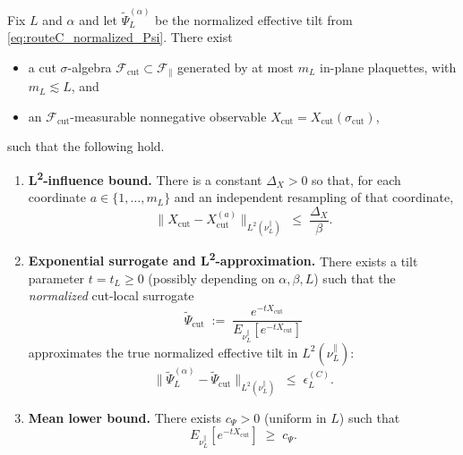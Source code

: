 \begin{proposition}\label{ass:routeC_cut_local_surrogate}
Fix $L$ and $\alpha$ and let $\widetilde\Psi_L^{(\alpha)}$ be the normalized effective tilt from \eqref{eq:routeC_normalized_Psi}.
There exist
\begin{itemize}
\item a cut $\sigma$-algebra $\mathscr F_{\mathrm{cut}}\subset \mathscr F_{\parallel}$ generated by at most $m_L$ in-plane plaquettes, with $m_L\lesssim L$, and
\item an $\mathscr F_{\mathrm{cut}}$-measurable nonnegative observable $X_{\mathrm{cut}}=X_{\mathrm{cut}}(\sigma_{\mathrm{cut}})$,
\end{itemize}
such that the following hold.
\begin{enumerate}[label=(\roman*)]
\item \textbf{L\textsuperscript{2}-influence bound.}
There is a constant $\Delta_X>0$ so that, for each coordinate $a\in\{1,\dots,m_L\}$ and an independent resampling of that coordinate,
\begin{equation}\label{eq:routeC_cut_influence_L2}
\big\|X_{\mathrm{cut}}-X_{\mathrm{cut}}^{(a)}\big\|_{L^2(\nu_L^{\parallel})}
\;\le\;
\frac{\Delta_X}{\beta}.
\end{equation}
\item \textbf{Exponential surrogate and L\textsuperscript{2}-approximation.}
There exists a tilt parameter $t=t_L\ge 0$ (possibly depending on $\alpha,\beta,L$) such that the \emph{normalized} cut-local surrogate
\begin{equation}\label{eq:routeC_surrogate_def}
\widetilde\Psi_{\mathrm{cut}}
\;:=\;
\frac{e^{-t X_{\mathrm{cut}}}}{E_{\nu_L^{\parallel}}\!\left[e^{-t X_{\mathrm{cut}}}\right]}
\end{equation}
approximates the true normalized effective tilt in $L^2(\nu_L^{\parallel})$:
\begin{equation}\label{eq:routeC_surrogate_L2}
\big\|\widetilde\Psi_L^{(\alpha)}-\widetilde\Psi_{\mathrm{cut}}\big\|_{L^2(\nu_L^{\parallel})}
\;\le\;
\epsilon_L^{(C)}.
\end{equation}
\item \textbf{Mean lower bound.}
There exists $c_{\Psi}>0$ (uniform in $L$) such that
\begin{equation}\label{eq:routeC_surrogate_mean_lower}
E_{\nu_L^{\parallel}}\!\left[e^{-t X_{\mathrm{cut}}}\right]\;\ge\;c_{\Psi}.
\end{equation}
\end{enumerate}
\end{proposition}


